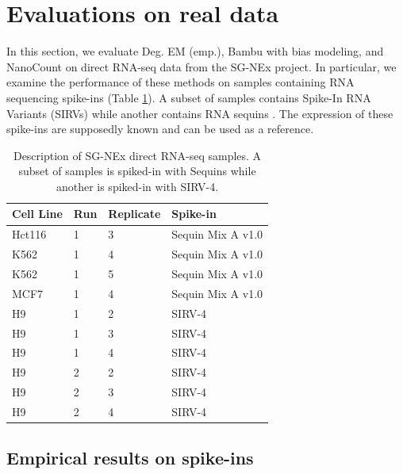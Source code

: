 \section{Evaluations on real data}

In this section, we evaluate Deg. EM (emp.), Bambu with bias modeling, and NanoCount on direct RNA-seq data from the SG-NEx project. In particular, we examine the performance of these methods on samples containing RNA sequencing spike-ins (Table \ref{tab-sgnex}). A subset of samples contains Spike-In RNA Variants (SIRVs) \cite{Lexogen20201} while another contains RNA sequins \cite{Sequins}. The expression of these spike-ins are supposedly known and can be used as a reference.   

\begin{table}[htbp]
  \centering
    \begin{tabular}{|p{2cm}|p{2cm}|p{2cm}|p{3.5cm}|}
    \hline
    Cell Line & Run & Replicate   & Spike-in \bigstrut\\
    \hline
    Hct116 & 1     & 3     & Sequin Mix A v1.0 \bigstrut\\
    \hline
    K562  & 1     & 4     & Sequin Mix A v1.0 \bigstrut\\
    \hline
    K562  & 1     & 5   & Sequin Mix A v1.0 \bigstrut\\
    \hline
    MCF7  & 1     & 4     & Sequin Mix A v1.0 \bigstrut\\
    \hline
    H9    & 1     & 2     & SIRV-4 \bigstrut\\
    \hline
    H9    & 1     & 3     & SIRV-4 \bigstrut\\
    \hline
    H9    & 1     & 4     & SIRV-4 \bigstrut\\
    \hline
    H9    & 2     & 2     & SIRV-4 \bigstrut\\
    \hline
    H9    & 2     & 3     & SIRV-4 \bigstrut\\
    \hline
    H9    & 2     & 4     & SIRV-4 \bigstrut\\
    \hline
    \end{tabular}%
  \caption[Description of SG-NEx direct RNA-seq samples.]{Description of SG-NEx direct RNA-seq samples. A subset of samples is spiked-in with Sequins while another is spiked-in with SIRV-4.}
  \label{tab-sgnex}
\end{table}%

\subsection{Empirical results on spike-ins}

